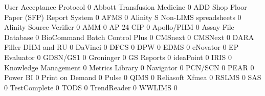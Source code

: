 \documentclass{article}
\begin{document}
\begin{Schunk}
\begin{Soutput}
                                           User Acceptance Protocol
                                                                  0
  Abbott Transfusion Medicine                                     0
  ADD Shop Floor Paper (SFP) Report System                        0
  AFMS                                                            0
  Alinity S Non-LIMS spreadsheets                                 0
  Alinity Source Verifier                                         0
  AMM                                                             0
  AP 24 CIP                                                       0
  Apollo/PHM                                                      0
  Assay File Database                                             0
  BioCommand Batch Control Plus                                   0
  CMSnext                                                         0
  CMSNext                                                         0
  DARA Filler DHM and RU                                          0
  DaVinci                                                         0
  DFCS                                                            0
  DPW                                                             0
  EDMS                                                            0
  eNovator                                                        0
  EP Evaluator                                                    0
  GDSN/GS1                                                        0
  Groninger                                                       0
  GS Reports                                                      0
  ideaPoint                                                       0
  IRIS                                                            0
  Knowledge Management                                            0
  Metrics Library                                                 0
  Navigator                                                       0
  PCN/SCN                                                         0
  PEAR                                                            0
  Power BI                                                        0
  Print on Demand                                                 0
  Pulse                                                           0
  QIMS                                                            0
  Reliasoft Xfmea                                                 0
  RSLMS                                                           0
  SAS                                                             0
  TestComplete                                                    0
  TODS                                                            0
  TrendReader                                                     0
  WWLIMS                                                          0
                                          

\end{Soutput}
\end{Schunk}
\end{document}
